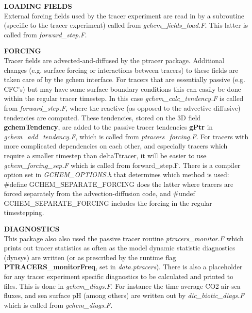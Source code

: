 \vspace{.5cm}


\noindent
{{\bf LOADING FIELDS}}\\
External forcing fields used by the tracer experiment are read
in by a subroutine (specific to the tracer experiment) called from
{\it gchem\_fields\_load.F}. This latter is called from \textit{forward\_step.F}.

\vspace{.5cm}


\noindent
{{\bf FORCING}}\\
Tracer fields are advected-and-diffused by the ptracer package.
Additional changes (e.g. surface forcing or interactions
between tracers) to these fields are taken care of by the gchem
interface. For tracers that are essentially passive (e.g. CFC's)
but may have some surface boundary conditions
this can easily be done within the regular tracer timestep. In this case
{\it gchem\_calc\_tendency.F} is called from {\it forward\_step.F}, where the 
reactive (as opposed to the advective diffusive) tendencies are computed.
These tendencies, stored on the 3D field \textbf{gchemTendency}, are added to
the passive tracer tendencies \textbf{gPtr} in {\it gchem\_add\_tendency.F}, 
which is called from {\it ptracers\_forcing.F}.
For tracers with more complicated dependencies on each other,
and especially tracers which require a smaller timestep than
deltaTtracer, it will be easier to use {\it gchem\_forcing\_sep.F}
which is called from forward\_step.F. There is a 
compiler option set in {\it GCHEM\_OPTIONS.h} that determines
which method is used: \#define GCHEM\_SEPARATE\_FORCING
does the latter where tracers are forced separately from the
advection-diffusion code, and \#undef GCHEM\_SEPARATE\_FORCING
includes the forcing in the regular timestepping.

\vspace{.5cm}

\noindent
{{\bf DIAGNOSTICS}}\\
This package also also used the passive tracer routine {\it ptracers\_monitor.F}
which prints out tracer statistics 
as often as the model dynamic statistic diagnostics (dynsys) are written (or
as prescribed by the runtime flag \textbf{PTRACERS\_monitorFreq}, set in {\it data.ptracers}).
There is also a placeholder for any tracer experiment
specific diagnostics to be calculated and printed to files.
This is done in {\it gchem\_diags.F}. For instance the time average CO2
air-sea fluxes, and sea surface pH (among others) are written
out by {\it dic\_biotic\_diags.F} which is called from {\it gchem\_diags.F}.

